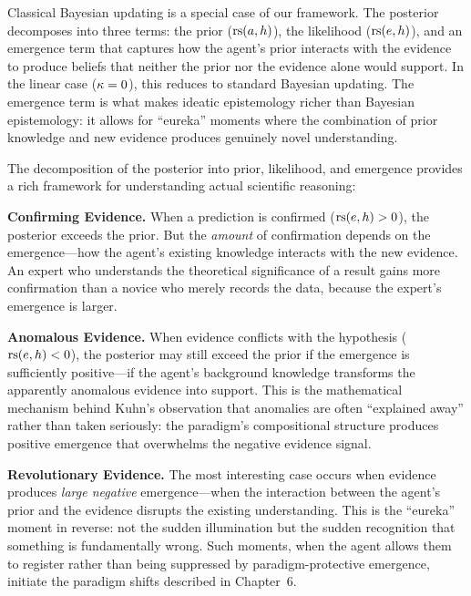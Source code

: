 \begin{interpretation}
Classical Bayesian updating is a special case of our framework. The posterior
decomposes into three terms: the prior ($\mathrm{rs}(a,h)$), the likelihood ($\mathrm{rs}(e,h)$),
and an emergence term that captures how the agent's prior interacts with the
evidence to produce beliefs that neither the prior nor the evidence alone would
support. In the linear case ($\kappa = 0$), this reduces to standard Bayesian
updating. The emergence term is what makes ideatic epistemology richer than
Bayesian epistemology: it allows for ``eureka'' moments where the combination
of prior knowledge and new evidence produces genuinely novel understanding.
\end{interpretation}

\begin{remark}
The decomposition of the posterior into prior, likelihood, and emergence provides
a rich framework for understanding actual scientific reasoning:

\textbf{Confirming Evidence.} When a prediction is confirmed ($\mathrm{rs}(e, h) > 0$),
the posterior exceeds the prior. But the \emph{amount} of confirmation depends on
the emergence---how the agent's existing knowledge interacts with the new evidence.
An expert who understands the theoretical significance of a result gains more
confirmation than a novice who merely records the data, because the expert's
emergence is larger.

\textbf{Anomalous Evidence.} When evidence conflicts with the hypothesis
($\mathrm{rs}(e, h) < 0$), the posterior may still exceed the prior if the emergence is
sufficiently positive---if the agent's background knowledge transforms the
apparently anomalous evidence into support. This is the mathematical mechanism
behind Kuhn's observation that anomalies are often ``explained away'' rather than
taken seriously: the paradigm's compositional structure produces positive emergence
that overwhelms the negative evidence signal.

\textbf{Revolutionary Evidence.} The most interesting case occurs when evidence
produces \emph{large negative} emergence---when the interaction between the agent's
prior and the evidence disrupts the existing understanding. This is the ``eureka''
moment in reverse: not the sudden illumination but the sudden recognition that
something is fundamentally wrong. Such moments, when the agent allows them to
register rather than being suppressed by paradigm-protective emergence, initiate
the paradigm shifts described in Chapter~6.
\end{remark}

